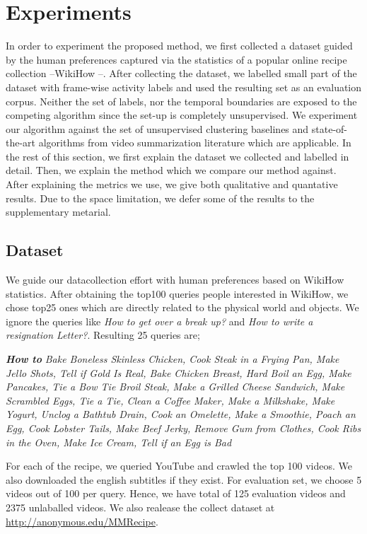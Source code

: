 \section{Experiments}
In order to experiment the proposed method, we first collected a dataset guided by the human preferences captured via the statistics of a popular online recipe collection --WikiHow \cite{wikiHow}--. After collecting the dataset, we labelled small part of the dataset with frame-wise activity labels and used the resulting set as an evaluation corpus. Neither the set of labels, nor the temporal boundaries are exposed to the competing algorithm since the set-up is completely unsupervised. We experiment our algorithm against the set of unsupervised clustering baselines and state-of-the-art algorithms from video summarization literature which are applicable. In the rest of this section, we first explain the dataset we collected and labelled in detail. Then, we explain the method which we compare our method against. After explaining the metrics we use, we give both qualitative and quantative results. Due to the space limitation, we defer some of the results to the supplementary metarial.

\subsection{Dataset}
We guide our datacollection effort with human preferences based on WikiHow \cite{wikiHow} statistics. After obtaining the top100 queries people interested in WikiHow, we chose top25 ones which are directly related to the physical world and objects. We ignore the queries like \emph{How to get over a break up‏?‎} and \emph{How to write a resignation Letter?}. Resulting 25 queries are;


\emph{\textbf{How to}}\footnotesize
\emph{Bake Boneless Skinless Chicken, Cook Steak in a Frying Pan, Make Jello Shots, Tell if Gold Is Real, Bake Chicken Breast, Hard Boil an Egg, Make Pancakes, Tie a Bow Tie
Broil Steak, Make a Grilled Cheese Sandwich, Make Scrambled Eggs, Tie a Tie, Clean a Coffee Maker, Make a Milkshake, Make Yogurt, Unclog a Bathtub Drain, Cook an Omelette,
Make a Smoothie, Poach an Egg, Cook Lobster Tails, Make Beef Jerky, Remove Gum from Clothes, Cook Ribs in the Oven, Make Ice Cream, Tell if an Egg is Bad}
\normalsize

For each of the recipe, we queried YouTube and crawled the top 100 videos. We also downloaded the english subtitles if they exist. For evaluation set, we choose 5 videos out of 100 per query. Hence, we have total of 125 evaluation videos and 2375 unlaballed videos. We also realease the collect dataset at \url{http://anonymous.edu/MMRecipe}.

